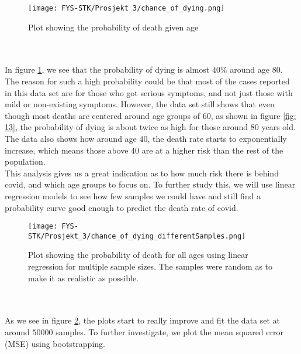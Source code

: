 \documentclass[english,notitlepage,reprint,nofootinbib]{revtex4-1}  %
\begin{document}
\begin{figure}[H]
    \centering
    \texttt{[image: FYS-STK/Prosjekt\_3/chance\_of\_dying.png]}
    \caption{Plot showing the probability of death given age}
    \label{fig: 14}
\end{figure}
\\
\\
In figure \ref{fig: 14}, we see that the probability of dying is almost $40 \%$ around age 80. The reason for such a high probability could be that most of the cases reported in this data set are for those who got serious symptoms, and not just those with mild or non-existing symptoms. However, the data set still shows that even though most deaths are centered around age groups of $60$, as shown in figure \ref{fig: 13}, the probability of dying is about twice as high for those around $80$ years old. The data also shows how around age $40$, the death rate starts to exponentially increase, which means those above $40$ are at a higher risk than the rest of the population. 
\\
This analysis gives us a great indication as to how much risk there is behind covid, and which age groups to focus on. To further study this, we will use linear regression models to see how few samples we could have and still find a probability curve good enough to predict the death rate of covid.
\begin{figure}[H]
    \centering
    \texttt{[image: FYS-STK/Prosjekt\_3/chance\_of\_dying\_differentSamples.png]}
    \caption{Plot showing the probability of death for all ages using linear regression for multiple sample sizes. The samples were random as to make it as realistic as possible.}
    \label{fig: 15}
\end{figure}
\\
\\
As we see in figure \ref{fig: 15}, the plots start to really improve and fit the data set at around $50 000$ samples. To further investigate, we plot the mean squared error (MSE) using bootstrapping. 
\end{document}
